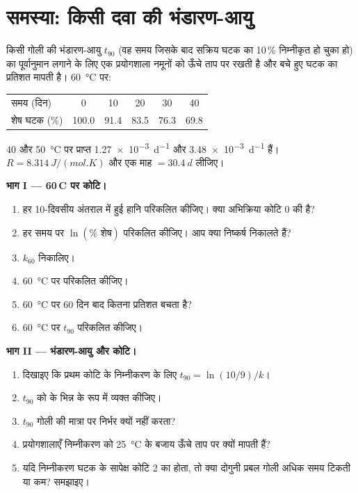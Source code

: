 \section{समस्या: किसी दवा की भंडारण-आयु}

\begin{problem}
\label{pb:b1:rate-laws:1}
किसी गोली की भंडारण-आयु $t_{90}$ (वह समय जिसके बाद सक्रिय घटक का 10\,\%
निम्नीकृत हो चुका हो) का पूर्वानुमान लगाने के लिए एक प्रयोगशाला नमूनों को
ऊँचे ताप पर रखती है और बचे हुए घटक का प्रतिशत मापती है।
\qty{60}{\celsius} पर:
\begin{center}
\begin{tabular}{lccccc}
\hline
समय (दिन) & 0 & 10 & 20 & 30 & 40 \\
शेष घटक (\%) & 100.0 & 91.4 & 83.5 & 76.3 & 69.8 \\
\hline
\end{tabular}
\end{center}
40 और \qty{50}{\celsius} पर प्राप्त 
\qty{1.27e-3}{d^{-1}} और \qty{3.48e-3}{d^{-1}} हैं। $R =
\qty{8.314}{J/(mol.K)}$ और एक माह $= \qty{30.4}{d}$ लीजिए।

\medskip
\noindent\textbf{भाग I --- 60\,\textdegree C पर कोटि।}
\begin{enumerate}
  \item हर 10-दिवसीय अंतराल में हुई हानि परिकलित कीजिए। क्या अभिक्रिया
        कोटि 0 की है?
  \item हर समय पर $\ln(\%\text{ शेष})$ परिकलित कीजिए। आप क्या निष्कर्ष निकालते हैं?
  \item {} $k_{60}$ निकालिए।
  \item \qty{60}{\celsius} पर  परिकलित कीजिए।
  \item \qty{60}{\celsius} पर 60 दिन बाद कितना प्रतिशत बचता है?
  \item \qty{60}{\celsius} पर $t_{90}$ परिकलित कीजिए।
\end{enumerate}

\medskip
\noindent\textbf{भाग II --- भंडारण-आयु और कोटि।}
\begin{enumerate}[resume]
  \item दिखाइए कि प्रथम कोटि के निम्नीकरण के लिए $t_{90} = \ln(10/9)/k$।
  \item $t_{90}$ को  के भिन्न के रूप में व्यक्त कीजिए।
  \item $t_{90}$ गोली की मात्रा पर निर्भर क्यों नहीं करता?
  \item प्रयोगशालाएँ निम्नीकरण को \qty{25}{\celsius} के बजाय ऊँचे ताप पर
        क्यों मापती हैं?
  \item यदि निम्नीकरण घटक के सापेक्ष कोटि 2 का होता, तो क्या दोगुनी
        प्रबल गोली अधिक समय टिकती या कम? समझाइए।
\end{enumerate}


\end{problem}
